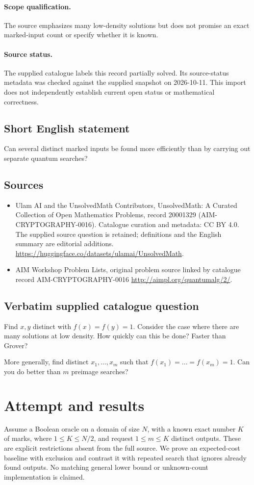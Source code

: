 \documentclass[11pt]{article}
\begin{document}
\paragraph{Scope qualification.}
The source emphasizes many low-density solutions but does not promise an exact marked-input count or specify whether it is known.
\paragraph{Source status.}
The supplied catalogue labels this record partially solved. Its source-status metadata was checked against the supplied snapshot on 2026-10-11. This import does not independently establish current open status or mathematical correctness.
\subsection{Short English statement}
Can several distinct marked inputs be found more efficiently than by carrying out separate quantum searches?
\subsection{Sources}
\begin{itemize}
\item[S1] Ulam AI and the UnsolvedMath Contributors, UnsolvedMath: A Curated Collection of Open Mathematics Problems, record 20001329 (AIM-CRYPTOGRAPHY-0016). Catalogue curation and metadata: CC BY 4.0. The supplied source question is retained; definitions and the English summary are editorial additions.
\url{https://huggingface.co/datasets/ulamai/UnsolvedMath}.
\item[S2] AIM Workshop Problem Lists, original problem source linked by catalogue record AIM-CRYPTOGRAPHY-0016
\url{http://aimpl.org/quantumalg/2/}.
\end{itemize}
\subsection{Verbatim supplied catalogue question}
Find $x,y$ distinct with $f(x) = f(y) = 1$. Consider the case where there are many solutions at low density. How quickly can this be done? Faster than Grover?

More generally, find distinct $x_1,\dots, x_m$ such that $f(x_1) = \dots = f(x_m) = 1$. Can you do better than $m$ preimage searches?

\section{Attempt and results}
Assume a Boolean oracle on a domain of size $N$, with a known exact number
$K$ of marks, where $1\le K\le N/2$, and request $1\le m\le K$ distinct
outputs. These are explicit restrictions absent from the full source. We
prove an expected-cost baseline with exclusion and contrast it with repeated
search that ignores already found outputs. No matching general lower bound
or unknown-count implementation is claimed.
\end{document}
